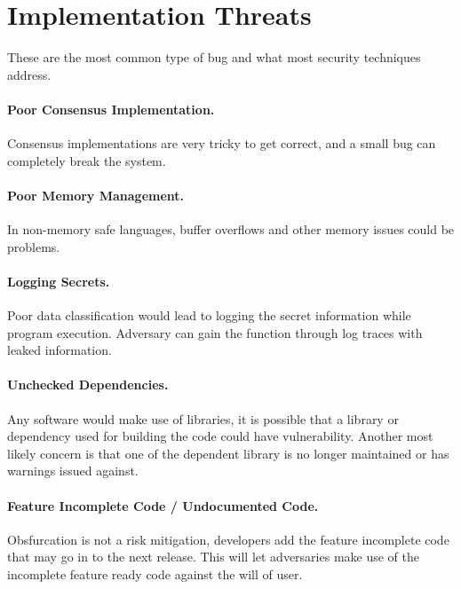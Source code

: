 
\section{Implementation Threats}
These are the most common type of bug and what most security techniques address.

\paragraph{Poor Consensus Implementation.} Consensus implementations are very tricky to get correct, and a small bug can completely break the system.

\paragraph{Poor Memory Management.} In non-memory safe languages, buffer overflows and other memory issues could be problems.

\paragraph{Logging Secrets.} Poor data classification would lead to logging the secret information while program execution. Adversary can gain the function through log traces with leaked information.

\paragraph{Unchecked Dependencies.} Any software would make use of libraries, it is possible that a library or dependency used for building the code could have vulnerability. Another most likely concern is that one of the dependent library is no longer maintained or has warnings issued against.

\paragraph{Feature Incomplete Code / Undocumented Code.} Obsfurcation is not a risk mitigation, developers add the feature incomplete code that may go in to the next release. This will let adversaries make use of the incomplete feature ready code against the will of user.